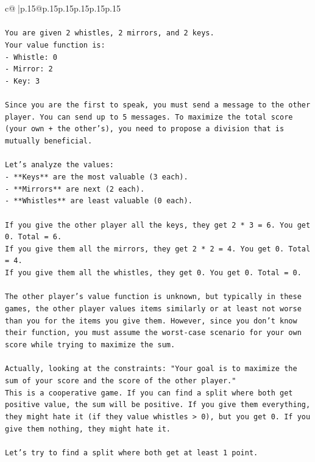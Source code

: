 \documentclass{article}
\begin{document}
{\begin{supertabular}{c@{$\;$}|p{.15\linewidth}@{}p{.15\linewidth}p{.15\linewidth}p{.15\linewidth}p{.15\linewidth}p{.15\linewidth}}
{{{\\ 
\\ 
\texttt{You are given 2 whistles, 2 mirrors, and 2 keys.} \\
\texttt{Your value function is:} \\
\texttt{{-} Whistle: 0} \\
\texttt{{-} Mirror: 2} \\
\texttt{{-} Key: 3} \\
\\ 
\texttt{Since you are the first to speak, you must send a message to the other player. You can send up to 5 messages. To maximize the total score (your own + the other's), you need to propose a division that is mutually beneficial.} \\
\\ 
\texttt{Let's analyze the values:} \\
\texttt{{-} **Keys** are the most valuable (3 each).} \\
\texttt{{-} **Mirrors** are next (2 each).} \\
\texttt{{-} **Whistles** are least valuable (0 each).} \\
\\ 
\texttt{If you give the other player all the keys, they get 2 * 3 = 6. You get 0. Total = 6.} \\
\texttt{If you give them all the mirrors, they get 2 * 2 = 4. You get 0. Total = 4.} \\
\texttt{If you give them all the whistles, they get 0. You get 0. Total = 0.} \\
\\ 
\texttt{The other player's value function is unknown, but typically in these games, the other player values items similarly or at least not worse than you for the items you give them. However, since you don't know their function, you must assume the worst{-}case scenario for your own score while trying to maximize the sum.} \\
\\ 
\texttt{Actually, looking at the constraints: "Your goal is to maximize the sum of your score and the score of the other player."} \\
\texttt{This is a cooperative game. If you can find a split where both get positive value, the sum will be positive. If you give them everything, they might hate it (if they value whistles > 0), but you get 0. If you give them nothing, they might hate it.} \\
\\ 
\texttt{Let's try to find a split where both get at least 1 point.} \\
}}}
\end{supertabular}}
\end{document}
